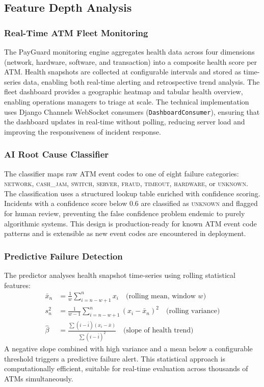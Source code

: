 \documentclass[12pt,a4paper]{article}
\begin{document}
\subsection{Feature Depth Analysis}

\subsubsection{Real-Time ATM Fleet Monitoring}

The PayGuard monitoring engine aggregates health data across four dimensions (network, hardware,
software, and transaction) into a composite health score per ATM. Health snapshots are collected
at configurable intervals and stored as time-series data, enabling both real-time alerting and
retrospective trend analysis. The fleet dashboard provides a geographic heatmap and tabular
health overview, enabling operations managers to triage at scale. The technical implementation
uses Django Channels WebSocket consumers (\texttt{DashboardConsumer}), ensuring that the
dashboard updates in real-time without polling, reducing server load and improving the
responsiveness of incident response.

\subsubsection{AI Root Cause Classifier}

The classifier maps raw ATM event codes to one of eight failure categories:
\textsc{network}, \textsc{cash\_jam}, \textsc{switch}, \textsc{server}, \textsc{fraud},
\textsc{timeout}, \textsc{hardware}, or \textsc{unknown}. The classification uses a
structured lookup table enriched with confidence scoring. Incidents with a confidence
score below 0.6 are classified as \textsc{unknown} and flagged for human review,
preventing the false confidence problem endemic to purely algorithmic systems. This
design is production-ready for known ATM event code patterns and is extensible as
new event codes are encountered in deployment.

\subsubsection{Predictive Failure Detection}

The predictor analyses health snapshot time-series using rolling statistical features:
\begin{align}
  \bar{x}_n &= \frac{1}{w}\sum_{i=n-w+1}^{n} x_i \quad \text{(rolling mean, window } w\text{)} \\
  s_n^2 &= \frac{1}{w-1}\sum_{i=n-w+1}^{n}(x_i - \bar{x}_n)^2 \quad \text{(rolling variance)} \\
  \hat{\beta} &= \frac{\sum(i - \bar{i})(x_i - \bar{x})}{\sum(i - \bar{i})^2} \quad \text{(slope of health trend)}
\end{align}
A negative slope combined with high variance and a mean below a configurable threshold
triggers a predictive failure alert. This statistical approach is computationally efficient,
suitable for real-time evaluation across thousands of ATMs simultaneously.
\end{document}
